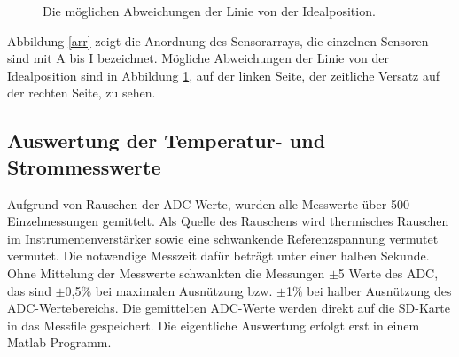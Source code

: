 \documentclass[a4paper,bibtotoc,oneside]{scrbook}
\begin{document}
\begin{figure}
\centering
\caption{Die möglichen Abweichungen der Linie von der Idealposition.}
\label{abw}
\end{figure} 

\noindent Abbildung \ref{arr} zeigt die Anordnung des Sensorarrays, die einzelnen Sensoren sind mit A bis I bezeichnet. Mögliche Abweichungen der Linie von der Idealposition sind in Abbildung \ref{abw}, auf der linken Seite, der zeitliche Versatz auf der rechten Seite, zu sehen.

\subsection{Auswertung der Temperatur- und Strommesswerte}\thispagestyle{empty}
Aufgrund von Rauschen der ADC-Werte, wurden alle Messwerte über 500 Einzelmessungen gemittelt. Als Quelle des Rauschens wird thermisches Rauschen im Instrumentenverstärker sowie eine schwankende Referenzspannung vermutet vermutet. Die notwendige Messzeit dafür beträgt unter einer halben Sekunde. Ohne Mittelung der Messwerte schwankten die Messungen $\pm$5 Werte des ADC, das sind $\pm$0,5$\%$ bei maximalen Ausnützung bzw. $\pm$1$\%$ bei halber Ausnützung des ADC-Wertebereichs. Die gemittelten ADC-Werte werden direkt auf die SD-Karte in das Messfile gespeichert. Die eigentliche Auswertung erfolgt erst in einem Matlab Programm.
 
\end{document}
